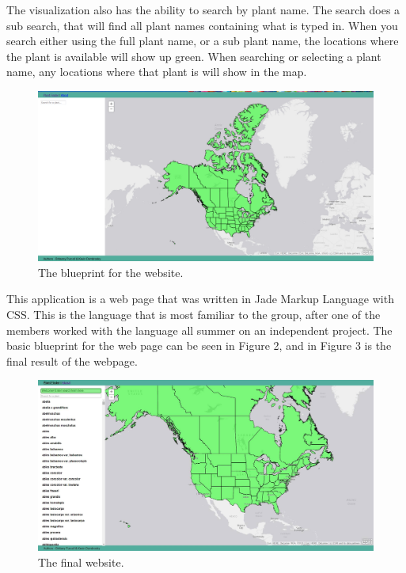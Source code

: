 \documentclass{Group6_Phase2}
\begin{document}
The visualization also has the ability to search by plant name. The search does a sub search, that will find all plant names containing what is typed in. When you search either using the full plant name, or a sub plant name, the locations where the plant is available will show up green. When searching or selecting a plant name, any locations where that plant is will show in the map. 

\begin{figure}[htb]
	\centering
	\includegraphics[scale=0.17]{Website_Screenshot.png}
	\caption{The blueprint for the website.}
\end{figure}


This application is a web page that was written in Jade Markup Language with CSS. This is the language that is most familiar to the group, after one of the members worked with the language all summer on an independent project. The basic blueprint for the web page can be seen in Figure 2, and in Figure 3 is the final result of the webpage.

\begin{figure}[htb]
	\centering
	\includegraphics[scale=0.12]{finalScreenshot.jpg}
	\caption{The final website.}
\end{figure}
\end{document}
